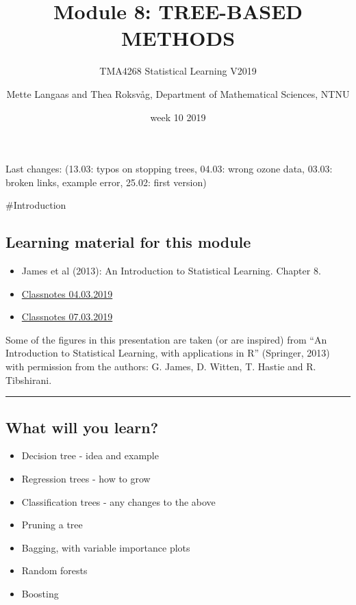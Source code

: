 \documentclass[]{article}
\title{Module 8: TREE-BASED METHODS}
\subtitle{TMA4268 Statistical Learning V2019}
\author{Mette Langaas and Thea Roksvåg, Department of Mathematical Sciences,
NTNU}
\date{week 10 2019}
\providecommand{\tightlist}{%
  \setlength{\itemsep}{0pt}\setlength{\parskip}{0pt}}
\begin{document}
\maketitle

{
\setcounter{tocdepth}{2}
\tableofcontents
}
Last changes: (13.03: typos on stopping trees, 04.03: wrong ozone data,
03.03: broken links, example error, 25.02: first version)

\#Introduction

\hypertarget{learning-material-for-this-module}{%
\subsection{Learning material for this
module}\label{learning-material-for-this-module}}

\begin{itemize}
\tightlist
\item
  James et al (2013): An Introduction to Statistical Learning. Chapter
  8.\\
\item
  \href{https://www.math.ntnu.no/emner/TMA4268/2019v/notes/M8L1notes.pdf}{Classnotes
  04.03.2019}
\item
  \href{https://www.math.ntnu.no/emner/TMA4268/2019v/notes/M8L2notes.pdf}{Classnotes
  07.03.2019}
\end{itemize}

Some of the figures in this presentation are taken (or are inspired)
from ``An Introduction to Statistical Learning, with applications in R''
(Springer, 2013) with permission from the authors: G. James, D. Witten,
T. Hastie and R. Tibshirani.

\begin{center}\rule{0.5\linewidth}{\linethickness}\end{center}

\hypertarget{what-will-you-learn}{%
\subsection{What will you learn?}\label{what-will-you-learn}}

\begin{itemize}
\tightlist
\item
  Decision tree - idea and example
\item
  Regression trees - how to grow
\item
  Classification trees - any changes to the above
\item
  Pruning a tree
\item
  Bagging, with variable importance plots
\item
  Random forests
\item
  Boosting
\end{itemize}
\end{document}
